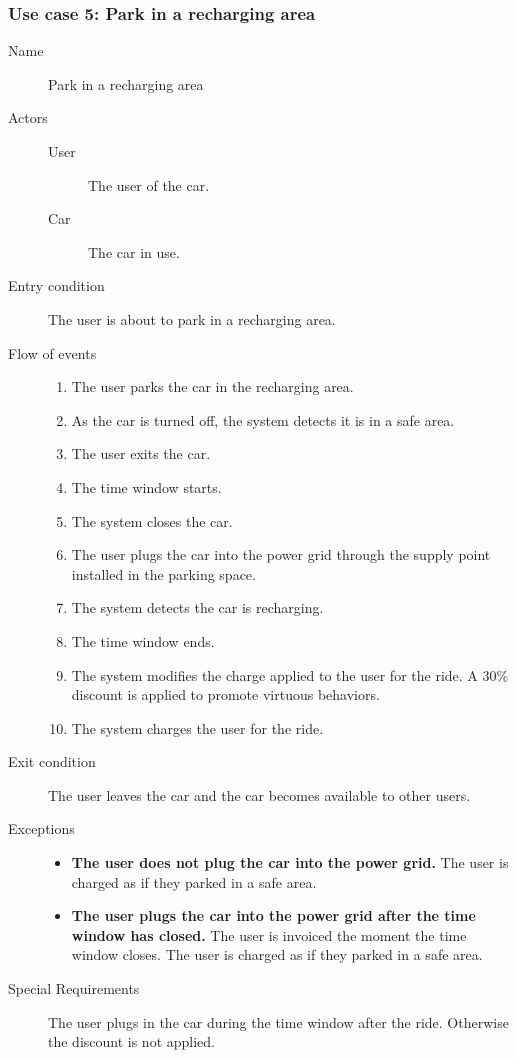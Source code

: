 	\subsubsection{Use case 5: Park in a recharging area}
		\begin{description}
			\item[Name] Park in a recharging area
			\item[Actors] \hfill
			\begin{description}
				\item[User] The user of the car.
				\item[Car] The car in use.
			\end{description}
			\item[Entry condition] The user is about to park in a recharging area.
			\item[Flow of events] \hfill
			\begin{enumerate}
				\item The user parks the car in the recharging area.
				\item As the car is turned off, the system detects it is in a safe area.
				\item The user exits the car.
				\item The time window starts.
				\item The system closes the car.
				\item The user plugs the car into the power grid through the supply point installed in the parking space.
				\item The system detects the car is recharging.
				\item The time window ends.
				\item The system modifies the charge applied to the user for the ride. A 30\% discount is applied to promote virtuous behaviors.
				\item The system charges the user for the ride.
			\end{enumerate}
			\item[Exit condition] The user leaves the car and the car becomes available to other users.
			\item[Exceptions] \hfill
			\begin{itemize}
				\item \textbf{The user does not plug the car into the power grid.} The user is charged as if they parked in a safe area.
				\item \textbf{The user plugs the car into the power grid after the time window has closed.} The user is invoiced the moment the time window closes. The user is charged as if they parked in a safe area.
			\end{itemize}
			\item[Special Requirements] The user plugs in the car during the time window after the ride. Otherwise the discount is not applied.
		\end{description}
	
